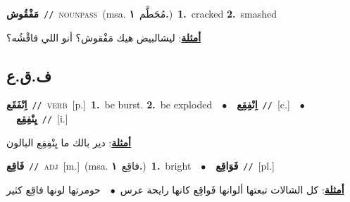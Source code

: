 \documentclass[10pt,a4paper,twoside]{article} %
\begin{document}
\begin{multicols}{2}
{\setlength\topsep{0pt}\textbf{\foreignlanguage{arabic}{مَفْقُوش}}\ {\color{gray}\texttt{//}\color{black}}\ \textsc{noun\textunderscore pass}\ \color{gray}(msa. \foreignlanguage{arabic}{مُحَطَّم}~\foreignlanguage{arabic}{\textbf{١.}})\color{black}\ \textbf{1.}~cracked  \textbf{2.}~smashed\  \begin{flushright}\color{gray}\foreignlanguage{arabic}{\textbf{\underline{\foreignlanguage{arabic}{أمثلة}}}: ليشالبيض هيك مَفْقوش؟ أنو اللي فاقْشُه؟}\end{flushright}\color{black}} \vspace{2mm}

\vspace{-3mm}
\subsection*{\color{blue}\foreignlanguage{arabic}{ف.ق.ع}\color{blue}{}} 

{\setlength\topsep{0pt}\textbf{\foreignlanguage{arabic}{اِنْفَقَع}}\ {\color{gray}\texttt{//}\color{black}}\ \textsc{verb}\ [p.]\ \textbf{1.}~be burst.  \textbf{2.}~be exploded\ \ $\bullet$\ \ \setlength\topsep{0pt}\textbf{\foreignlanguage{arabic}{اِنْفِقِع}}\ {\color{gray}\texttt{//}\color{black}}\ [c.]\ \ $\bullet$\ \ \setlength\topsep{0pt}\textbf{\foreignlanguage{arabic}{يِنْفِقِع}}\ {\color{gray}\texttt{//}\color{black}}\ [i.]\  \begin{flushright}\color{gray}\foreignlanguage{arabic}{\textbf{\underline{\foreignlanguage{arabic}{أمثلة}}}: دير بالك ما يِنْفِقِع البالون}\end{flushright}\color{black}} \vspace{2mm}

{\setlength\topsep{0pt}\textbf{\foreignlanguage{arabic}{فَاقِع}}\ {\color{gray}\texttt{//}\color{black}}\ \textsc{adj}\ [m.]\ \color{gray}(msa. \foreignlanguage{arabic}{فاقِع}~\foreignlanguage{arabic}{\textbf{١.}})\color{black}\ \textbf{1.}~bright\ \ $\bullet$\ \ \setlength\topsep{0pt}\textbf{\foreignlanguage{arabic}{فَوَاقِع}}\ {\color{gray}\texttt{//}\color{black}}\ [pl.]\  \begin{flushright}\color{gray}\foreignlanguage{arabic}{\textbf{\underline{\foreignlanguage{arabic}{أمثلة}}}: كل الشالات تبعتها ألوانها فَواقِع كانها رايحة عرس\ $\bullet$\ \  حومرتها لونها فاقِع كثير}\end{flushright}\color{black}} \vspace{2mm}


\end{multicols}
\end{document}
